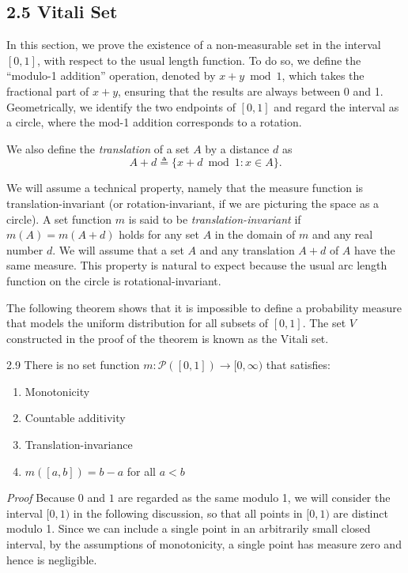 \subsection*{2.5 Vitali Set}

In this section, we prove the existence of a non-measurable set in the interval $[0,1]$, with respect to the usual length function. To do so, we define the ``modulo-1 addition'' operation, denoted by $x+y \bmod 1$, which takes the fractional part of $x+y$, ensuring that the results are always between 0 and 1. Geometrically, we identify the two endpoints of $[0,1]$ and regard the interval as a circle, where the mod-1 addition corresponds to a rotation.

We also define the \textit{translation} of a set $A$ by a distance $d$ as
\[
A+d \triangleq \{x+d \bmod 1 : x\in A\}.
\]

We will assume a technical property, namely that the measure function is translation-invariant (or rotation-invariant, if we are picturing the space as a circle). A set function $m$ is said to be \textit{translation-invariant} if $m(A)=m(A+d)$ holds for any set $A$ in the domain of $m$ and any real number $d$. We will assume that a set $A$ and any translation $A+d$ of $A$ have the same measure. This property is natural to expect because the usual arc length function on the circle is rotational-invariant.

The following theorem shows that it is impossible to define a probability measure that models the uniform distribution for all subsets of $[0,1]$. The set $V$ constructed in the proof of the theorem is known as the Vitali set.

\begin{thmbox}{2.9}
There is no set function $m:\mathcal{P}([0,1])\to [0,\infty)$ that satisfies:
\begin{enumerate}[label=\arabic*.]
    \item Monotonicity
    \item Countable additivity
    \item Translation-invariance
    \item $m([a,b])=b-a$ for all $a<b$
\end{enumerate}
\end{thmbox}

\textit{Proof} Because $0$ and $1$ are regarded as the same modulo 1, we will consider the interval $[0,1)$ in the following discussion, so that all points in $[0,1)$ are distinct modulo 1. Since we can include a single point in an arbitrarily small closed interval, by the assumptions of monotonicity, a single point has measure zero and hence is negligible.

